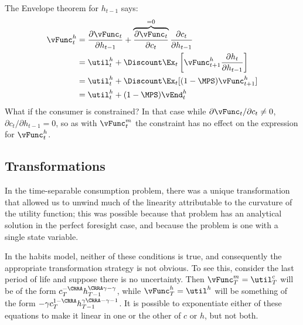 \documentclass[titlepage]{\econtex}
\begin{document}
{  The Envelope theorem for $h_{t-1}$ says:
  \begin{equation}\begin{gathered}\begin{aligned}
    {\vFunc}_{t}^{h}  & = \frac{\partial {\vFunc}_{t}}{\partial h_{t-1}} + \overbrace{\frac{\partial {\vFunc}_{t}}{\partial {c}_{t}}}^{=0}\frac{\partial {c}_{t}}{\partial h_{t-1}} \nonumber
    \\  & = \util^{h}_{t} + \Discount \Ex_{t} \left[{\vFunc}_{t+1}^{h}\frac{\partial h_{t}}{\partial h_{t-1}} \right]\nonumber
    \\  & = \util^{h}_{t} + \Discount \Ex_{t} [(1-\MPS) {\vFunc}_{t+1}^{h}] \nonumber
    \\  & = \util^{h}_{t} + (1-\MPS) \vEnd_{t}^{h} \label{eq:vhtformula}
  \end{aligned}\end{gathered}\end{equation}
  What if the consumer is constrained?  In that case while $\partial
  {\vFunc}_{t}/\partial {c}_{t} \neq 0$, $\partial {c}_{t}/\partial h_{t-1} = 0$, so as
  with ${\vFunc}_{t}^{m}$ the constraint has no effect on the expression for ${\vFunc}^{h}_{t}$.

  \hypertarget{Transforamtions}{}
  \subsection{Transformations}

  In the time-separable consumption problem, there was a unique
  transformation that allowed us to unwind much of the linearity
  attributable to the curvature of the utility function; this was
  possible because that problem has an analytical solution in the
  perfect foresight case, and because the problem is one with a single
  state variable.

  In the habits model, neither of these conditions is true, and
  consequently the appropriate transformation strategy is not obvious.
  To see this, consider the last period of life and suppose there is no
  uncertainty.  Then ${\vFunc}_{T}^{m} = \util_{T}^{c}$ will be of the form
  ${c}_{T}^{-\CRRA}h_{T-1}^{\CRRA \gamma - \gamma}$, while ${\vFunc}_{T}^{h} =
  \util^{h}$ will be something of the form $-\gamma
  {c}_{T}^{1-\CRRA}h_{T-1}^{\gamma\CRRA-\gamma-1}$.  It is possible to
  exponentiate either of these equations to make it linear in one or the
  other of ${c}$ or $h$, but not both.

}
\end{document}
